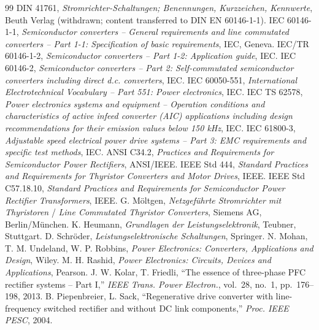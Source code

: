 \documentclass[11pt,a4paper]{article}
\begin{document}
\begin{thebibliography}{99}
 DIN 41761, \emph{Stromrichter-Schaltungen; Benennungen, Kurzzeichen, Kennwerte}, Beuth Verlag (withdrawn; content transferred to DIN EN 60146-1-1).
 IEC 60146-1-1, \emph{Semiconductor converters -- General requirements and line commutated converters -- Part 1-1: Specification of basic requirements}, IEC, Geneva.
 IEC/TR 60146-1-2, \emph{Semiconductor converters -- Part 1-2: Application guide}, IEC.
 IEC 60146-2, \emph{Semiconductor converters -- Part 2: Self-commutated semiconductor converters including direct d.c. converters}, IEC.
 IEC 60050-551, \emph{International Electrotechnical Vocabulary -- Part 551: Power electronics}, IEC.
 IEC TS 62578, \emph{Power electronics systems and equipment -- Operation conditions and characteristics of active infeed converter (AIC) applications including design recommendations for their emission values below 150 kHz}, IEC.
 IEC 61800-3, \emph{Adjustable speed electrical power drive systems -- Part 3: EMC requirements and specific test methods}, IEC.
 ANSI C34.2, \emph{Practices and Requirements for Semiconductor Power Rectifiers}, ANSI/IEEE.
 IEEE Std 444, \emph{Standard Practices and Requirements for Thyristor Converters and Motor Drives}, IEEE.
 IEEE Std C57.18.10, \emph{Standard Practices and Requirements for Semiconductor Power Rectifier Transformers}, IEEE.
 G. Möltgen, \emph{Netzgeführte Stromrichter mit Thyristoren} / \emph{Line Commutated Thyristor Converters}, Siemens AG, Berlin/München.
 K. Heumann, \emph{Grundlagen der Leistungselektronik}, Teubner, Stuttgart.
 D. Schröder, \emph{Leistungselektronische Schaltungen}, Springer.
 N. Mohan, T. M. Undeland, W. P. Robbins, \emph{Power Electronics: Converters, Applications and Design}, Wiley.
 M. H. Rashid, \emph{Power Electronics: Circuits, Devices and Applications}, Pearson.
 J. W. Kolar, T. Friedli, ``The essence of three-phase PFC rectifier systems -- Part I,'' \emph{IEEE Trans. Power Electron.}, vol.~28, no.~1, pp.~176--198, 2013.
 B. Piepenbreier, L. Sack, ``Regenerative drive converter with line-frequency switched rectifier and without DC link components,'' \emph{Proc. IEEE PESC}, 2004.
\end{thebibliography}
\end{document}
